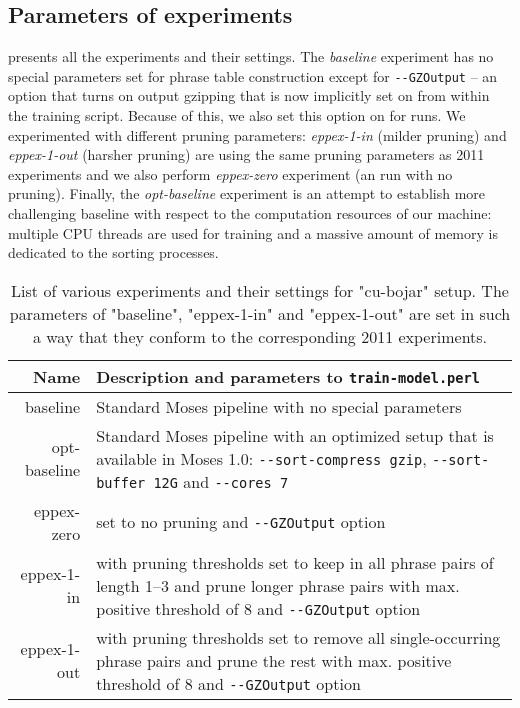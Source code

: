 \subsection{Parameters of experiments}

 presents all the experiments and their settings.
The \emph{baseline} experiment has no special parameters set for phrase table
construction except for \verb|--GZOutput| -- an option that turns on output
gzipping that is now implicitly set on from within the training script.
Because of this, we also set this option on for \eppex{} runs.
We experimented with different pruning parameters: \emph{eppex-1-in} (milder
pruning) and \emph{eppex-1-out} (harsher pruning) are using the same pruning
parameters as 2011 experiments and we also perform \emph{eppex-zero} experiment
(an \eppex{} run with no pruning).
Finally, the \emph{opt-baseline} experiment is an attempt to establish more
challenging baseline with respect to the computation resources of our machine:
multiple CPU threads are used for training and a massive amount of memory is
dedicated to the sorting processes.

\begin{table}[ht]
\centering
\begin{tabular}{ r p{10cm} }
Name & Description and parameters to \verb|train-model.perl| \\
\hline
\hline
baseline & Standard Moses pipeline with no special parameters \\
opt-baseline & Standard Moses pipeline with an optimized setup that is
available in Moses 1.0:
\verb|--sort-compress gzip|, \verb|--sort-buffer 12G| and \verb|--cores 7| \\
eppex-zero & \eppex{} set to no pruning and \verb|--GZOutput| option \\
eppex-1-in & \eppex{} with pruning thresholds set to keep in
all phrase pairs of length 1--3 and prune longer phrase pairs
with max. positive threshold of 8 and \verb|--GZOutput| option \\
eppex-1-out & \eppex{} with pruning thresholds set to remove
all single-occurring phrase pairs and prune the rest with
max. positive threshold of 8 and \verb|--GZOutput| option \\
\hline
\hline
\end{tabular}
\caption{\label{cu-bojar-scenarios}List of various experiments and their
settings for "cu-bojar" setup. The parameters of "baseline", "eppex-1-in"
and "eppex-1-out" are set in such a way that they conform to the
corresponding 2011 experiments.}
\end{table}

